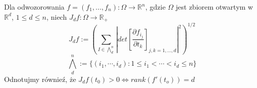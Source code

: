 \begin{defi}
	Dla odwozorowania $f = (f_1, ..., f_n): \Omega \rightarrow \mathbb{R}^n$, gdzie $\Omega$ jest zbiorem otwartym w $\mathbb{R}^d$, $1 \leq d \leq n$, niech $J_df: \Omega \rightarrow \mathbb{R}_+$ $$ 
	J_df := \left( \sum_{I \in \bigwedge_d^n} \left| det \left[ \frac{\partial f_{i_j}}{\partial t_k} \right]_{j,k=1,\dots,d} \right|^2 \right)^{1/2}
	$$
	$$
		\bigwedge_d^n := \{ (i_1, \cdots, i_d): 1 \leq i_1 < \cdots < i_d \leq n \}
	$$
	Odnotujmy równieź, że $J_df(t_0) > 0 \Leftrightarrow rank(f'(t_o))  =d$ 
\end{defi}